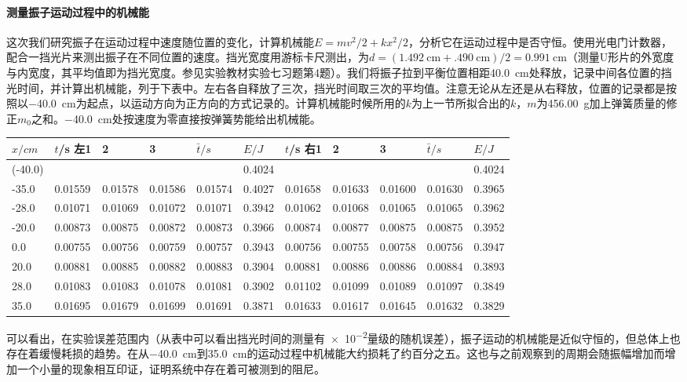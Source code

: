 \documentclass[UTF8]{ctexart}
\begin{document}
\paragraph{测量振子运动过程中的机械能}
这次我们研究振子在运动过程中速度随位置的变化，计算机械能$E=mv^2/2+kx^2/2$，分析它在运动过程中是否守恒。使用光电门计数器，配合一挡光片来测出振子在不同位置的速度。挡光宽度用游标卡尺测出，为$d=(\SI{1.492}{\cm}+\SI{.490}{\cm})/2=\SI{0.991}{\cm}$（测量U形片的外宽度与内宽度，其平均值即为挡光宽度。参见实验教材实验七习题第4题）。我们将振子拉到平衡位置相距\SI{40.0}{\cm}处释放，记录中间各位置的挡光时间，并计算出机械能，列于下表中。左右各自释放了三次，挡光时间取三次的平均值。注意无论从左还是从右释放，位置的记录都是按照以\SI{-40.0}{\cm}为起点，以运动方向为正方向的方式记录的。计算机械能时候所用的$k$为上一节所拟合出的$k$，$m$为\SI{456.00}{\g}加上弹簧质量的修正$m_0$之和。\SI{-40.0}{\cm}处按速度为零直接按弹簧势能给出机械能。
\begin{center}\begin{tabu} to \linewidth {X[c]|X[c]X[c]X[c]|X[c]X[c]||X[c]X[c]X[c]|X[c]X[c]}
\hline
$x/\si{cm}$	&$t$/s 左1 	&2	&3	&$\bar{t}/s$	&$E/J$&$t$/s 右1	&2	&3	&$\bar{t}/s$	&$E/J$
\\
\hline
(-40.0)	&	&	&	&	&0.4024	&&&&	&0.4024\\
-35.0	&0.01559	&0.01578	&0.01586	&0.01574	&0.4027	&0.01658	&0.01633	&0.01600	&0.01630	&0.3965\\
-28.0	&0.01071	&0.01069	&0.01072	&0.01071	&0.3942	&0.01062	&0.01068	&0.01065	&0.01065	&0.3962\\
-20.0	&0.00873	&0.00875	&0.00872	&0.00873	&0.3966	&0.00874	&0.00877	&0.00875	&0.00875	&0.3952\\
0.0	&0.00755	&0.00756	&0.00759	&0.00757	&0.3943	&0.00756	&0.00755	&0.00758	&0.00756	&0.3947\\
20.0	&0.00881	&0.00885	&0.00882	&0.00883	&0.3904	&0.00881	&0.00886	&0.00886	&0.00884	&0.3893\\
28.0	&0.01083	&0.01083	&0.01078	&0.01081	&0.3902	&0.01102	&0.01099	&0.01089	&0.01097	&0.3849\\
35.0	&0.01695	&0.01679	&0.01699	&0.01691	&0.3871	&0.01633	&0.01617	&0.01645	&0.01632	&0.3829\\
\hline
\end{tabu}\end{center}
可以看出，在实验误差范围内（从表中可以看出挡光时间的测量有\num{e-2}量级的随机误差），振子运动的机械能是近似守恒的，但总体上也存在着缓慢耗损的趋势。在从\SI{-40.0}{\cm}到\SI{35.0}{\cm}的运动过程中机械能大约损耗了约百分之五。这也与之前观察到的周期会随振幅增加而增加一个小量的现象相互印证，证明系统中存在着可被测到的阻尼。
\end{document}
